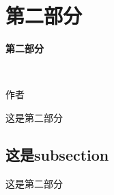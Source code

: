 \section*{第二部分}

\begin{frame}
\centerline{\textbf{\Large{第二部分}}} 
~\\
\centerline{\large{作者}}
\end{frame}


\begin{frame}
这是第二部分
\end{frame}


\subsection*{这是subsection}

\begin{frame}
这是第二部分
\end{frame}